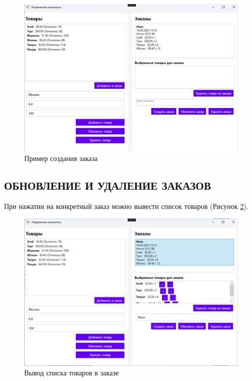 \documentclass[12pt]{article}
\begin{document}
\begin{figure}[ht]
	\centering
	\includegraphics[width=1.0\textwidth]{fig/image 62.png}
	\caption{Пример создания заказа} %
	\label{fig:demo5}
\end{figure}

\pagebreak

\subsection{ОБНОВЛЕНИЕ И УДАЛЕНИЕ ЗАКАЗОВ}

При нажатии на конкретный заказ можно вывести список товаров (Рисунок \ref{fig:demo6}).

\begin{figure}[ht]
	\centering
	\includegraphics[width=1.0\textwidth]{fig/image 63.png}
	\caption{Вывод списка товаров в заказе}
	\label{fig:demo6}
\end{figure}
\end{document}
